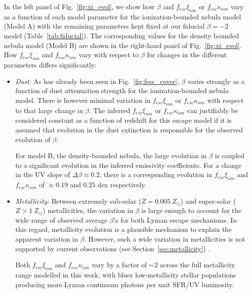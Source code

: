 In the left panel of Fig.~\ref{fig:xi_evol}, we show how $\beta$ and $f_{esc}\xi_{ion}$ or $f_{esc}\kappa_{ion}$ vary as a function of each model parameter for the ionization-bounded nebula model (Model A) with the remaining parameters kept fixed at our fiducial $\beta = -2$ model (Table~\ref{tab:fiducial}). The corresponding values for the density bounded nebula model (Model B) are shown in the right-hand panel of Fig.~\ref{fig:xi_evol}. How $f_{esc}\xi_{ion}$ and $f_{esc}\kappa_{ion}$ vary with respect to $\beta$ for changes in the different parameters differs significantly:

\begin{itemize}
    \item \emph{Dust:} As has already been seen in Fig.~\ref{fig:fesc_cover}, $\beta$ varies strongly as a function of dust attenuation strength for the ionization-bounded nebula model. There is however minimal variation in $f_{esc}\xi_{ion}$ or $f_{esc}\kappa_{ion}$ with respect to that large change in $\beta$. The inferred $f_{esc}\xi_{ion}$ or $f_{esc}\kappa_{ion}$ can justifiably be considered constant as a function of redshift for this escape model if it is assumed that evolution in the dust extinction is responsible for the observed evolution of $\beta$.
    
    For model B, the density-bounded nebula, the large evolution in $\beta$ is coupled to a significant evolution in the inferred emissivity coefficients. For a change in the UV slope of $\Delta\beta \approx 0.2$, there is a corresponding evolution in $f_{esc}\xi_{ion}$ and$f_{esc}\kappa_{ion}$ of $\approx 0.19$ and $0.25$ dex respectively.
        
    \item \emph{Metallicity:} Between extremely sub-solar ($Z=0.005~Z_{\odot}$) and super-solar ($Z>1~Z_{\odot}$) metallicities, the variation in $\beta$ is large enough to account for the wide range of observed average $\beta$'s for both Lyman escape mechanisms. In this regard, metallicity evolution is a plausible mechanism to explain the apparent variation in $\beta$. However, such a wide variation in metallicities is not supported by current observations (see Section~\ref{sec:metallicity}) .
    
    Both $f_{esc}\xi_{ion}$ and $f_{esc}\kappa_{ion}$ vary by a factor of $\sim2$ across the full metallicity range modelled in this work, with bluer low-metallicity stellar populations producing more Lyman continuum photons per unit SFR/UV luminosity.
    

\end{itemize}
